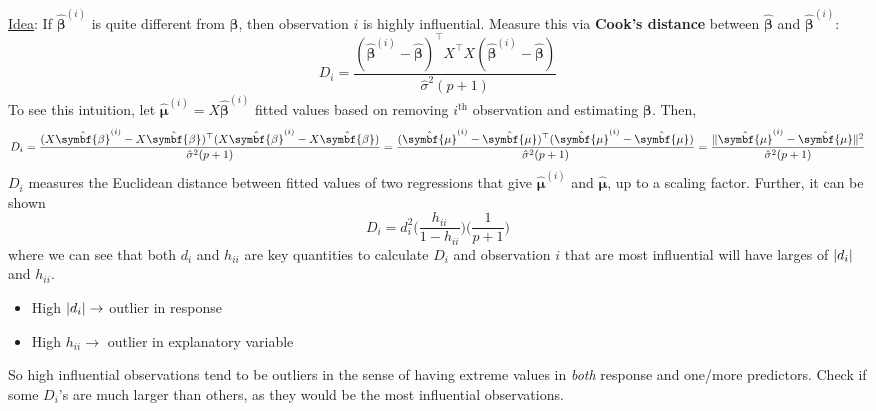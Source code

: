 \begin{enumerate}[(1)]
          \underline{Idea}: If $ \hat{\symbf{\beta}}^{(i)} $
          is quite different from $ \hat{\symbf{\beta}} $, then
          observation $ i $ is highly influential. Measure this
          via \textbf{Cook's distance} between $ \hat{\symbf{\beta}} $
          and $ \hat{\symbf{\beta}}^{(i)} $:
          \[ D_i=\frac{(\hat{\symbf{\beta}}^{(i)}-\hat{\symbf{\beta}})^{\top}
                  X^\top X(\hat{\symbf{\beta}}^{(i)}-\hat{\symbf{\beta}})}{
                  \hat{\sigma}^2(p+1)
              }  \]
          To see this intuition, let $ \hat{\symbf{\mu}}^{(i)}=X\hat{\symbf{\beta}}^{(i)} $
          fitted values based on removing $ i^{\text{th}} $ observation and
          estimating $ \symbf{\beta} $. Then,
          \[ D_i=\frac{(X\hat{\symbf{\beta}}^{(i)}-X\hat{\symbf{\beta}})^{\top}
                  (X\hat{\symbf{\beta}}^{(i)}-X\hat{\symbf{\beta}})}{
                  \hat{\sigma}^2(p+1)
              }=\frac{(\hat{\symbf{\mu}}^{(i)}-\hat{\symbf{\mu}})^\top
                  (\hat{\symbf{\mu}}^{(i)}-\hat{\symbf{\mu}})
              }{
                  \hat{\sigma}^2(p+1)
              }=\frac{
                  \norm{\hat{\symbf{\mu}}^{(i)}
                      -\hat{\symbf{\mu}}}^2
              }{
                  \hat{\sigma}^2(p+1)
              }    \]
          $ D_i $ measures the Euclidean distance between fitted
          values of two regressions that give
          $ \hat{\symbf{\mu}}^{(i)} $ and $ \hat{\symbf{\mu}} $,
          up to a scaling factor. Further, it can be shown
          \[ D_i=d_i^2\biggl( \frac{h_{ii}}{1-h_{ii}} \biggr)
              \biggl( \frac{1}{p+1} \biggr) \]
          where we can see that both $ d_i $ and $ h_{ii} $
          are key quantities to calculate $ D_i $ and
          observation $ i $ that are most influential will have
          larges of $ \lvert d_i\rvert $ and $ h_{ii} $.
          \begin{itemize}
              \item High $ \lvert d_i\rvert\rightarrow $ outlier in response
              \item High $ h_{ii}\rightarrow $ outlier in explanatory variable
          \end{itemize}
          So high influential observations tend to be outliers
          in the sense of having extreme values in \emph{both}
          response and one/more predictors. Check if some
          $ D_i $'s are much larger than others,
          as they would be the most influential observations.
\end{enumerate}
